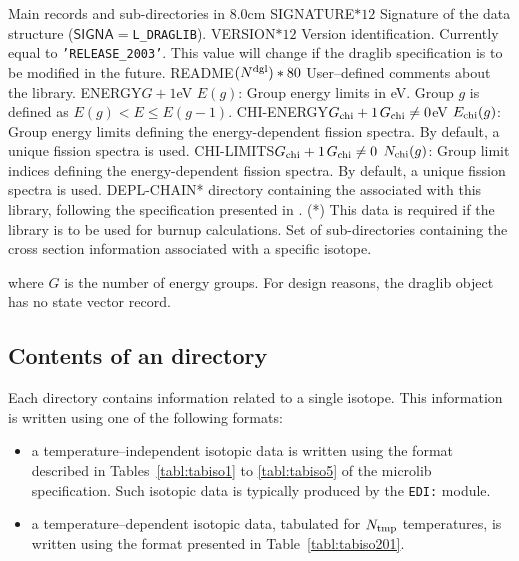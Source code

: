 \begin{DescriptionEnregistrement}{Main records and sub-directories in }{8.0cm}
\CharEnr
  {SIGNATURE}{$*12$}
  {Signature of the data structure ($\mathsf{SIGNA}=${\tt L\_DRAGLIB}).}
\CharEnr
  {VERSION}{$*12$}
  {Version identification. Currently equal to {\tt 'RELEASE\_2003'}. This value
  will change if the {\sc draglib} specification is to be modified in the future.}
\CharEnr
  {README}{$(N^{\rm dgl})*80$}
  {User--defined comments about the library.}
\RealEnr
  {ENERGY}{$G+1$}{eV}
  {$E(g)$: Group energy limits in eV. Group $g$ is defined as $E(g) < E \le E(g-1)$.}
\OptRealEnr
  {CHI-ENERGY}{$G_{\rm chi}+1$}{$G_{\rm chi}\ne 0$}{eV}
  {$E_{\rm chi}(g)$: Group energy limits defining the energy-dependent fission spectra. By default, a unique fission spectra is used.}
\OptIntEnr
  {CHI-LIMITS}{$G_{\rm chi}+1$}{$G_{\rm chi}\ne 0$}
  {$N_{\rm chi}(g)$: Group limit indices defining the energy-dependent fission spectra. By default, a unique fission spectra is used.}
\OptDirEnr
  {DEPL-CHAIN}{*}
  {directory containing the  associated with this library, following
  the specification presented in . (*) This data is required
  if the library is to be used for burnup calculations.}
\DirVar
  {}
  {Set of sub-directories containing the cross section information
   associated with a specific isotope.}
\end{DescriptionEnregistrement}

\noindent where $G$ is the number of energy groups. For design reasons, the
{\sc draglib} object has no state vector record.

\subsection{Contents of an  directory}\label{sect:isotopeDrag}

Each  directory contains information related to a single isotope.
This information is written using one of the following formats:
\begin{itemize}
\item a temperature--independent isotopic data is written using the format described
in Tables~\ref{tabl:tabiso1} to \ref{tabl:tabiso5} of the {\sc microlib}
specification. Such isotopic data is typically produced by the {\tt EDI:} module.
\item a temperature--dependent isotopic data, tabulated for $N_{\rm tmp}$ temperatures, is
written using the format presented in Table~\ref{tabl:tabiso201}.
\end{itemize}

